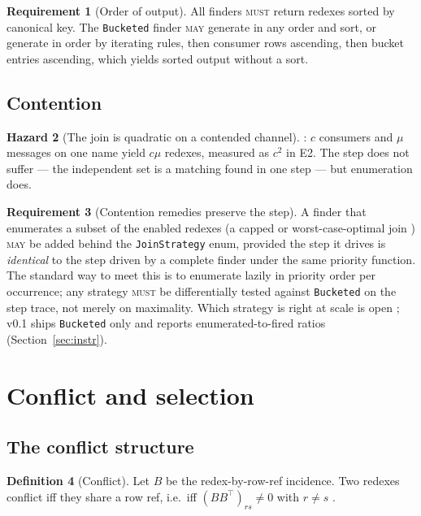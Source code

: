 \documentclass[11pt,a4paper]{article}
\newcommand{\code}[1]{\texttt{#1}}
\newcommand{\MUST}{\textsc{must}}
\newcommand{\MAY}{\textsc{may}}
\theoremstyle{definition}
\newtheorem{definition}{Definition}[section]
\newtheorem{requirement}[definition]{Requirement}
\newtheorem{hazard}[definition]{Hazard}
\theoremstyle{plain}
\begin{document}
\begin{requirement}[Order of output]\label{req:findorder}
All finders \MUST{} return redexes sorted by canonical key. The
\code{Bucketed} finder \MAY{} generate in any order and sort, or generate in
order by iterating rules, then consumer rows ascending, then bucket entries
ascending, which yields sorted output without a sort.
\end{requirement}

\subsection{Contention}

\begin{hazard}[The join is quadratic on a contended channel]\label{haz:contention}
\cite[Rem.~7.2]{matnote}: $c$ consumers and $\mu$ messages on one name yield
$c\mu$ redexes, measured as $c^{2}$ in E2. The step does not suffer --- the
independent set is a matching found in one step --- but enumeration does.
\end{hazard}

\begin{requirement}[Contention remedies preserve the step]\label{req:contention}
A finder that enumerates a subset of the enabled redexes (a capped or
worst-case-optimal join \cite{ngo}) \MAY{} be added behind the
\code{JoinStrategy} enum, provided the step it drives is \emph{identical} to
the step driven by a complete finder under the same priority function. The
standard way to meet this is to enumerate lazily in priority order per
occurrence; any strategy \MUST{} be differentially tested against
\code{Bucketed} on the step trace, not merely on maximality. Which strategy is
right at scale is open \cite[Rem.~7.2]{matnote}; v0.1 ships \code{Bucketed}
only and reports enumerated-to-fired ratios (Section~\ref{sec:instr}).
\end{requirement}

\section{Conflict and selection}\label{sec:select}

\subsection{The conflict structure}

\begin{definition}[Conflict]\label{def:conflict}
Let $B$ be the redex-by-row-ref incidence. Two redexes conflict iff they
share a row ref, i.e.\ iff $(BB^{\top})_{rs} \neq 0$ with $r \neq s$
\cite[Def.~7.3]{matnote}.
\end{definition}
\end{document}
